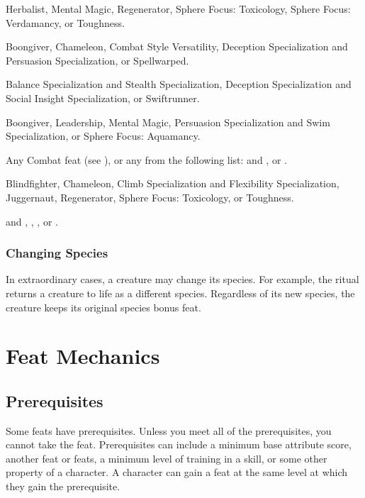              Herbalist, Mental Magic, Regenerator, Sphere Focus: Toxicology, Sphere Focus: Verdamancy, or Toughness.

             Boongiver, Chameleon, Combat Style Versatility, Deception Specialization and Persuasion Specialization, or Spellwarped.

             Balance Specialization and Stealth Specialization, Deception Specialization and Social Insight Specialization, or Swiftrunner.

             Boongiver, Leadership, Mental Magic, Persuasion Specialization and Swim Specialization, or Sphere Focus: Aquamancy.

             Any Combat feat (see ), or any from the following list:  and , or .

             Blindfighter, Chameleon, Climb Specialization and Flexibility Specialization, Juggernaut, Regenerator, Sphere Focus: Toxicology, or Toughness.

              and , , , or .

        \subsubsection{Changing Species}
            In extraordinary cases, a creature may change its species.
            For example, the  ritual returns a creature to life as a different species.
            Regardless of its new species, the creature keeps its original species bonus feat.

\section{Feat Mechanics}

    \subsection{Prerequisites}
        Some feats have prerequisites.
        Unless you meet all of the prerequisites, you cannot take the feat.
        Prerequisites can include a minimum base attribute score, another feat or feats, a minimum level of training in a skill, or some other property of a character.
        A character can gain a feat at the same level at which they gain the prerequisite.

